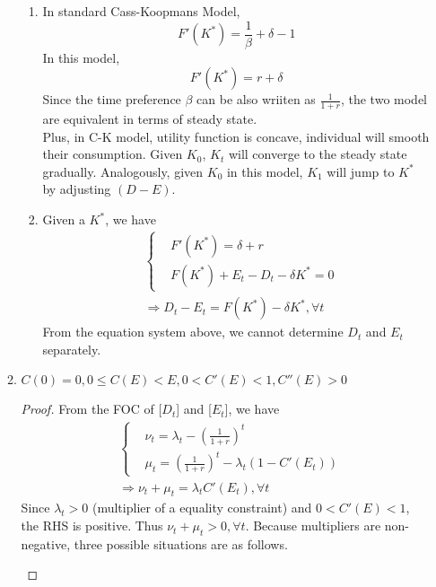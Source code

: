\documentclass{article}
\begin{document}
\begin{enumerate}
\begin{enumerate}
\begin{enumerate}
                \item In standard Cass-Koopmans Model, \[F'(K^\ast)=\frac{1}{\beta}+\delta-1\]
                In this model, \[F'(K^\ast)=r+\delta\]
                Since the time preference \(\beta\) can be also wriiten as \(\frac1{1+r}\), the two model are equivalent in terms of steady state.\\
                Plus, in C-K model, utility function is concave, individual will smooth their consumption. Given \(K_0\), \(K_t\) will converge to the steady state gradually.
                Analogously, given \(K_0\) in this model, \(K_1\) will jump to \(K^\ast\) by adjusting \((D-E)\).
                \item Given a $K^\ast$, we have
                \begin{align*}
                    &\left\{\begin{aligned}
                        &{F}'(K^\ast)=\delta+r\\
                        &F(K^\ast)+E_t-D_t-\delta K^\ast=0
                    \end{aligned}\right.\\
                    &\Rightarrow D_t-E_t=F(K^\ast)-\delta K^\ast,\forall t
                \end{align*}
                From the equation system above, we cannot determine $D_t$ and $E_t$ separately.
            \end{enumerate}
            \item \(C(0)=0, 0\le C(E)<E,0<{C}'(E)<1,{C}''(E)>0\)
            \begin{proof}
                From the FOC of [$D_t$] and [$E_t$], we have
                \begin{align*}
                    &\left\{\begin{aligned}
                        &\nu_t=\lambda_t-(\frac{1}{1+r})^t\\
                        &\mu_t=(\frac{1}{1+r})^t-\lambda_t(1-{C}'(E_t))
                    \end{aligned}\right.\\
                    &\Rightarrow\nu_t+\mu_t=\lambda_t{C}'(E_t),\forall t
                \end{align*}
                Since $\lambda_t>0$ (multiplier of a equality constraint) and $0<{C}'(E)<1$, the RHS is positive. Thus $\nu_t+\mu_t>0,\forall t$.
                Because multipliers are non-negative, three possible situations are as follows.
                \begin{enumerate}[label=(\roman*)]

\end{enumerate}
\end{proof}
\end{enumerate}
\end{enumerate}
\end{document}
